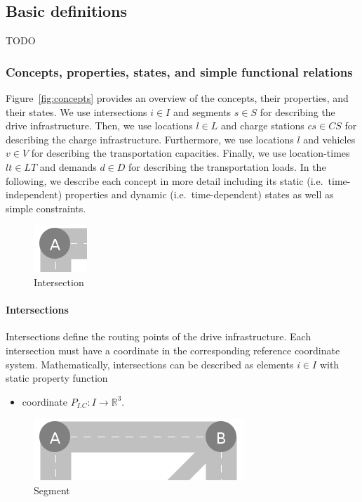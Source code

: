 \documentclass{IEEEtran}
\begin{document}
    \subsection{Basic definitions}
    \label{sec:concepts}
    TODO

    \subsubsection{Concepts, properties, states, and simple functional relations}
    Figure~\ref{fig:concepts} provides an overview of the concepts, their properties, and their states.
    We use intersections $i \in I$ and segments $s \in S$ for describing the drive infrastructure.
    Then, we use locations $l \in L$ and charge stations $cs \in CS$ for describing the charge infrastructure.
    Furthermore, we use locations $l$ and vehicles $v \in V$ for describing the transportation capacities.
    Finally, we use location-times $lt \in LT$ and demands $d \in D$ for describing the transportation loads.
    In the following, we describe each concept in more detail including its static (i.e.\ time-independent) properties and dynamic (i.e.\ time-dependent) states as well as simple constraints.

    \begin{figure}[htbp]
        \centering
        \includegraphics[scale=0.5]{../../concepts/intersection.png}
        \caption{Intersection}
        \label{fig:intersection}
    \end{figure}
    
    \paragraph{Intersections}
    Intersections define the routing points of the drive infrastructure.
    Each intersection must have a coordinate in the corresponding reference coordinate system.
    Mathematically, intersections can be described as elements $i \in I$ with static property function
    \begin{itemize}
        \item coordinate $P_{I.C}: I \rightarrow \mathbb{R}^3$.
    \end{itemize}

    \begin{figure}[htbp]
        \centering
        \includegraphics[scale=0.5]{../../concepts/segment.png}
        \caption{Segment}
        \label{fig:segment}
    \end{figure}
\end{document}
